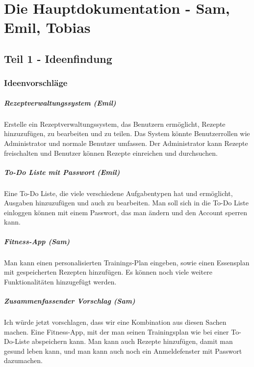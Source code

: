 \documentclass[ngerman]{report}
\begin{document}
\tableofcontents

\chapter{Die Hauptdokumentation - Sam, Emil, Tobias}

\section{Teil 1 - Ideenfindung}

\subsection{Ideenvorschläge}

\paragraph{Rezeptverwaltungssystem (Emil)}

Erstelle ein Rezeptverwaltungssystem, das Benutzern ermöglicht, Rezepte
hinzuzufügen, zu bearbeiten und zu teilen. Das System könnte
Benutzerrollen wie Administrator und normale Benutzer umfassen. Der
Administrator kann Rezepte freischalten und Benutzer können Rezepte
einreichen und durchsuchen.

\paragraph{To-Do Liste mit Passwort (Emil)}

Eine To-Do Liste, die viele verschiedene Aufgabentypen hat und
ermöglicht, Ausgaben hinzuzufügen und auch zu bearbeiten. Man soll sich
in die To-Do Liste einloggen können mit einem Passwort, das man ändern
und den Account sperren kann.

\paragraph{Fitness-App (Sam)}

Man kann einen personalisierten Trainings-Plan eingeben, sowie einen
Essensplan mit gespeicherten Rezepten hinzufügen. Es können noch viele
weitere Funktionalitäten hinzugefügt werden.

\paragraph{Zusammenfassender Vorschlag (Sam)}

Ich würde jetzt vorschlagen, dass wir eine Kombination aus diesen Sachen
machen. Eine Fitness-App, mit der man seinen Trainingsplan wie bei einer
To-Do-Liste abspeichern kann. Man kann auch Rezepte hinzufügen, damit
man gesund leben kann, und man kann auch noch ein Anmeldefenster mit
Passwort dazumachen.
\end{document}
